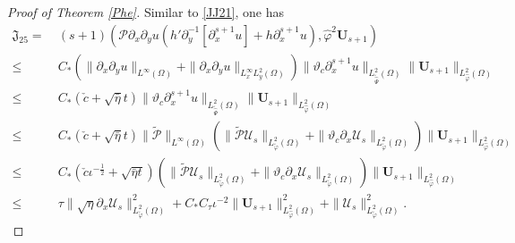 \documentclass[10pt,a4paper]{amsart}
\begin{document}
\begin{proof}[Proof of Theorem \ref{Phe}]
Similar to \eqref{JJ21}, one has
\begin{align}\label{JJ25}
\mathfrak{J}_{25}
=&~(s+1)(\mathcal{P}\partial_{x}\partial_{y}u(h'\partial_{y}^{-1}[\partial_{x}^{s+1}u]+h\partial_{x}^{s+1}u),\hat{\varphi}^{2}\mathbf{U}_{s+1})\\
\leq&~C_{*}\left(\|\partial_{x}\partial_{y}u\|_{L^{\infty}(\Omega)}+\|\partial_{x}\partial_{y}u\|_{L_{x}^{\infty}L_{y}^{2}(\Omega)}\right)
           \|\vartheta_{c}\partial_{x}^{s+1}u\|_{L_{\tilde{\hat{\Psi}}}^{2}(\Omega)}\|\mathbf{U}_{s+1}\|_{L_{\hat{\varphi}}^{2}(\Omega)}\nonumber\\
\leq&~C_{*}(\check{c}+\sqrt{\bar{\eta}}t)
      \|\vartheta_{c}\partial_{x}^{s+1}u\|_{L_{\tilde{\hat{\Psi}}}^{2}(\Omega)}\|\mathbf{U}_{s+1}\|_{L_{\hat{\varphi}}^{2}(\Omega)}\nonumber\\
\leq&~C_{*}(\check{c}+\sqrt{\bar{\eta}}t)\|\tilde{\mathcal{P}}\|_{L^{\infty}(\Omega)}
      \left(\|\tilde{\mathcal{P}}\mathcal{U}_{s}\|_{L_{\tilde{\varphi}}^{2}(\Omega)}+\|\vartheta_{c}\partial_{x}\mathcal{U}_{s}\|_{L_{\tilde{\varphi}}^{2}(\Omega)}\right)
      \|\mathbf{U}_{s+1}\|_{L_{\hat{\varphi}}^{2}(\Omega)}\nonumber\\
\leq&~C_{*}(\check{c}\iota^{-\frac{1}{2}}+\sqrt{\bar{\eta}t})
      \left(\|\tilde{\mathcal{P}}\mathcal{U}_{s}\|_{L_{\tilde{\varphi}}^{2}(\Omega)}+\|\vartheta_{c}\partial_{x}\mathcal{U}_{s}\|_{L_{\tilde{\varphi}}^{2}(\Omega)}\right)
      \|\mathbf{U}_{s+1}\|_{L_{\hat{\varphi}}^{2}(\Omega)}\nonumber\\
\leq&~\tau\|\sqrt{\eta}\partial_{x}\mathcal{U}_{s}\|_{L_{\tilde{\varphi}}^{2}(\Omega)}^{2}
     +C_{*}C_{\tau}\iota^{-2}\|\mathbf{U}_{s+1}\|_{L_{\hat{\varphi}}^{2}(\Omega)}^{2}
     +\|\mathcal{U}_{s}\|_{L_{\tilde{\varphi}}^{2}(\Omega)}^{2}.\nonumber
\end{align}


\end{proof}
\end{document}
